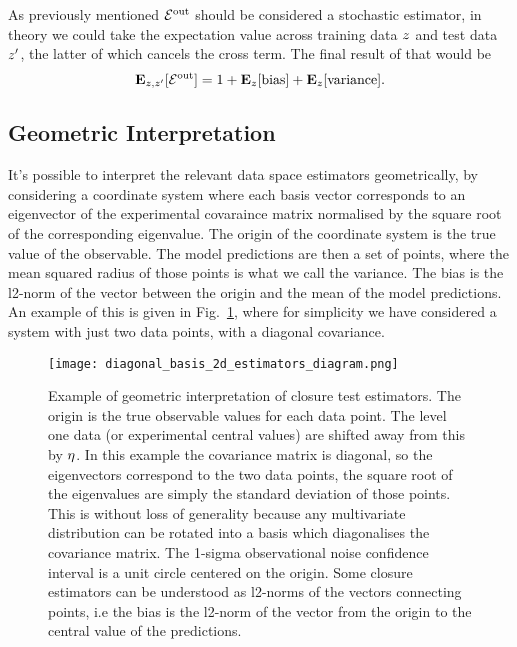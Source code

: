 As previously mentioned $\mathcal{E}^{\rm out}$ should be considered a stochastic estimator, in
theory we could take the expectation value across training data $z$ and
test data $z^{\prime}$, the latter of which cancels the cross term. The
final result of that would be
\begin{equation}\label{eq:ExpectedBiasVariance}
    \mathbf{E}_{z, z^\prime}[\mathcal{E}^{\rm out}] =
    1 + \mathbf{E}_{z}[{\rm bias}] + \mathbf{E}_{z}[{\rm variance}].
\end{equation}

\subsection{Geometric Interpretation}

It's possible to interpret the relevant data space estimators geometrically,
by considering a coordinate system where each basis vector corresponds to
an eigenvector of the experimental covaraince matrix normalised by the
square root of the corresponding eigenvalue. The origin of the coordinate system
is the true value of the observable. The model predictions are then a set of
points, where the mean squared radius of those points is what we call the variance.
The bias is the l2-norm of the vector between the origin and the mean of the
model predictions. An example of this is given in Fig.~\ref{fig:diagram2destimators},
where for simplicity we have considered a system with just two data points,
with a diagonal covariance.
%
\begin{figure}
    \centering
    \texttt{[image: diagonal\_basis\_2d\_estimators\_diagram.png]}
    \caption{Example of geometric interpretation of closure test estimators.
    The origin
    is the true observable values for each data point. The level one data (or
    experimental central values) are
    shifted away from this by $\eta$. In this example the covariance matrix
    is diagonal, so the eigenvectors correspond to the two data points, the
    square root of the eigenvalues are simply the standard deviation of those
    points. This is without loss of generality because any multivariate distribution
    can be rotated into a basis which diagonalises the covariance matrix.
    The 1-sigma observational noise confidence interval
    is a unit circle centered on the origin. Some closure
    estimators can be understood as l2-norms of the vectors connecting points,
    i.e the bias is the l2-norm of the vector from the origin to the central
    value of the predictions.}
    \label{fig:diagram2destimators}
\end{figure}
%
